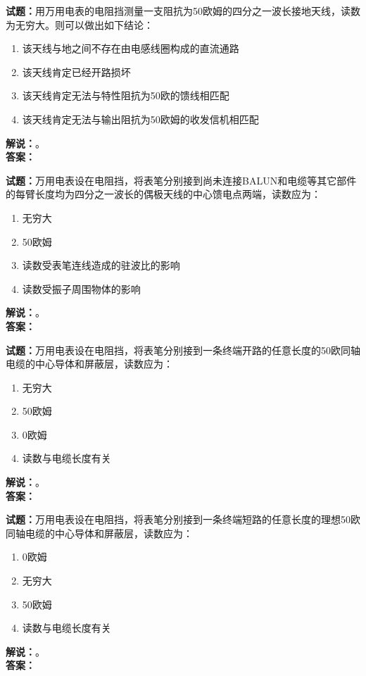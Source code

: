 \documentclass{ctexbook}
\begin{document}
\vspace{\baselineskip}

\noindent\textbf{试题：}用万用电表的电阻挡测量一支阻抗为50欧姆的四分之一波长接地天线，读数为无穷大。则可以做出如下结论：
\begin{enumerate}[leftmargin=3em]
  \item 该天线与地之间不存在由电感线圈构成的直流通路
  \item 该天线肯定已经开路损坏
  \item 该天线肯定无法与特性阻抗为50欧的馈线相匹配
  \item 该天线肯定无法与输出阻抗为50欧姆的收发信机相匹配
\end{enumerate}
\noindent\textbf{解说：}\textbf{}。\\\noindent\textbf{答案：}

\vspace{\baselineskip}

\noindent\textbf{试题：}万用电表设在电阻挡，将表笔分别接到尚未连接BALUN和电缆等其它部件的每臂长度均为四分之一波长的偶极天线的中心馈电点两端，读数应为：
\begin{enumerate}[leftmargin=3em]
  \item 无穷大
  \item 50欧姆
  \item 读数受表笔连线造成的驻波比的影响
  \item 读数受振子周围物体的影响
\end{enumerate}
\noindent\textbf{解说：}\textbf{}。\\\noindent\textbf{答案：}

\vspace{\baselineskip}

\noindent\textbf{试题：}万用电表设在电阻挡，将表笔分别接到一条终端开路的任意长度的50欧同轴电缆的中心导体和屏蔽层，读数应为：
\begin{enumerate}[leftmargin=3em]
  \item 无穷大
  \item 50欧姆
  \item 0欧姆
  \item 读数与电缆长度有关
\end{enumerate}
\noindent\textbf{解说：}\textbf{}。\\\noindent\textbf{答案：}

\vspace{\baselineskip}

\noindent\textbf{试题：}万用电表设在电阻挡，将表笔分别接到一条终端短路的任意长度的理想50欧同轴电缆的中心导体和屏蔽层，读数应为：
\begin{enumerate}[leftmargin=3em]
  \item 0欧姆
  \item 无穷大
  \item 50欧姆
  \item 读数与电缆长度有关
\end{enumerate}
\noindent\textbf{解说：}\textbf{}。\\\noindent\textbf{答案：}
\end{document}
